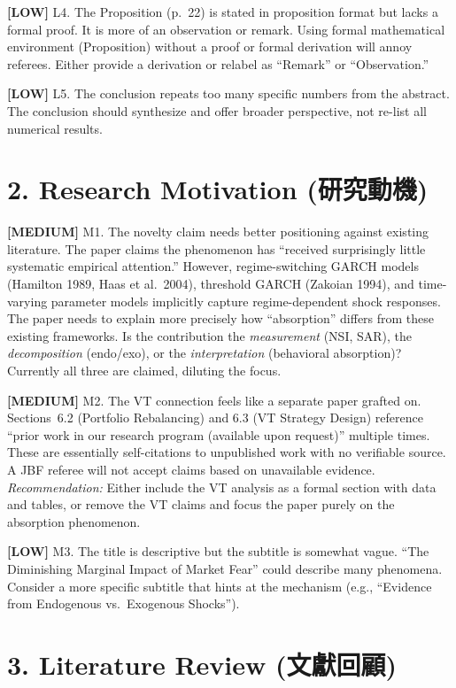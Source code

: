 \documentclass[12pt,a4paper]{article}
\newcommand{\med}[1]{\textcolor{warncolor}{\textbf{[MEDIUM]} #1}}
\newcommand{\low}[1]{\textcolor{okgreen}{\textbf{[LOW]} #1}}
\begin{document}
\low{L4. The Proposition (p.~22) is stated in proposition format but lacks a formal proof.} It is more of an observation or remark. Using formal mathematical environment (Proposition) without a proof or formal derivation will annoy referees. Either provide a derivation or relabel as ``Remark'' or ``Observation.''

\low{L5. The conclusion repeats too many specific numbers from the abstract.} The conclusion should synthesize and offer broader perspective, not re-list all numerical results.

\section*{2. Research Motivation (研究動機)}

\med{M1. The novelty claim needs better positioning against existing literature.} The paper claims the phenomenon has ``received surprisingly little systematic empirical attention.'' However, regime-switching GARCH models (Hamilton 1989, Haas et al.\ 2004), threshold GARCH (Zakoian 1994), and time-varying parameter models implicitly capture regime-dependent shock responses. The paper needs to explain more precisely how ``absorption'' differs from these existing frameworks. Is the contribution the \emph{measurement} (NSI, SAR), the \emph{decomposition} (endo/exo), or the \emph{interpretation} (behavioral absorption)? Currently all three are claimed, diluting the focus.

\med{M2. The VT connection feels like a separate paper grafted on.} Sections~6.2 (Portfolio Rebalancing) and 6.3 (VT Strategy Design) reference ``prior work in our research program (available upon request)'' multiple times. These are essentially self-citations to unpublished work with no verifiable source. A JBF referee will not accept claims based on unavailable evidence. \emph{Recommendation:} Either include the VT analysis as a formal section with data and tables, or remove the VT claims and focus the paper purely on the absorption phenomenon.

\low{M3. The title is descriptive but the subtitle is somewhat vague.} ``The Diminishing Marginal Impact of Market Fear'' could describe many phenomena. Consider a more specific subtitle that hints at the mechanism (e.g., ``Evidence from Endogenous vs.\ Exogenous Shocks'').

\section*{3. Literature Review (文獻回顧)}
\end{document}
